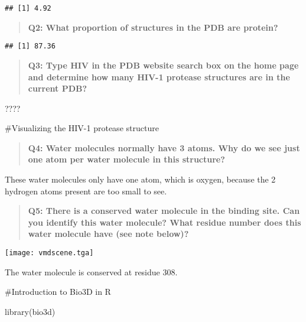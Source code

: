 \documentclass[
]{article}
\newenvironment{Shaded}{\begin{snugshade}}{\end{snugshade}}
\newcommand{\DecValTok}[1]{\textcolor[rgb]{0.00,0.00,0.81}{#1}}
\newcommand{\FunctionTok}[1]{\textcolor[rgb]{0.00,0.00,0.00}{#1}}
\newcommand{\NormalTok}[1]{#1}
\newcommand{\SpecialCharTok}[1]{\textcolor[rgb]{0.00,0.00,0.00}{#1}}
\begin{document}
\begin{verbatim}
## [1] 4.92
\end{verbatim}

\begin{quote}
\textbf{Q2: What proportion of structures in the PDB are protein?}
\end{quote}

\begin{Shaded}
\end{Shaded}

\begin{verbatim}
## [1] 87.36
\end{verbatim}

\begin{quote}
\textbf{Q3: Type HIV in the PDB website search box on the home page and
determine how many HIV-1 protease structures are in the current PDB?}
\end{quote}

????

\#Visualizing the HIV-1 protease structure

\begin{quote}
\textbf{Q4: Water molecules normally have 3 atoms. Why do we see just
one atom per water molecule in this structure?}
\end{quote}

These water molecules only have one atom, which is oxygen, because the 2
hydrogen atoms present are too small to see.

\begin{quote}
\textbf{Q5: There is a conserved water molecule in the binding site. Can
you identify this water molecule? What residue number does this water
molecule have (see note below)?}
\end{quote}

\texttt{[image: vmdscene.tga]}

The water molecule is conserved at residue 308.

\#Introduction to Bio3D in R

\begin{Shaded}
\begin{Highlighting}[]
\FunctionTok{library}\NormalTok{(bio3d)}
\end{Highlighting}
\end{Shaded}
\end{document}
